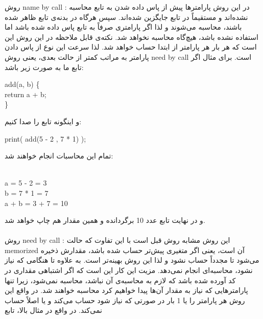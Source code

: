 

روش 
name by call
:
در این روش
پارامترها پیش از پاس داده شدن به تابع محاسبه نشده‌اند و مستقیماً
در تابع جایگزین شده‌اند.
 سپس هرگاه در بدنه‌ی تابع ظاهر شده باشند،
محاسبه می‌شوند و لذا اگر پارامتری صرفاً به تابع پاس داده شده باشد اما استفاده نشده باشد، هیچ‌گاه محاسبه نخواهد شد.
نکته‌ی قابل ملاحظه در این روش این است که
هر بار هر پارامتر از ابتدا حساب خواهد شد.
لذا سرعت این نوع از پاس دادن پارامتر به مراتب کمتر از حالت بعدی،
یعنی روش
need by call
است.
برای مثال اگر تابع ما به صورت زیر باشد:
\begin{latin}
add(a, b)
\small\{
\\
return a + b;
\\
\small\}
\end{latin}
و اینگونه تابع را صدا کنیم:
\\
\begin{latin}
print( add(5 - 2 , 7  * 1) );
\\
\end{latin}
تمام این محاسبات انجام خواهند شد:
\begin{latin}
\\
a = 5 - 2 = 3
\\
b = 7 * 1 = 7
\\
a + b = 3 + 7 = 10
\end{latin}
و در نهایت تابع عدد 10 
برگردانده  و
همین مقدار هم چاپ خواهد شد.
\\ \\
روش
need by call
:
این روش مشابه روش قبل 
است با این تفاوت که
حالت
memorized
آن است،
یعنی اگر متغیری پیش‌تر حساب شده باشد،
مقدارش ذخیره می‌شود تا مجدداً حساب نشود
 و لذا این روش بهینه‌تر است.
به علاوه تا هنگامی
که نیاز نشود،
محاسبه‌ای انجام نمی‌دهد.
مزیت این کار این است که اگر اشتباهی مقداری در کد آورده شده باشد که لازم به محاسبه‌ی
آن نباشد،
محاسبه نمی‌شود،
زیرا تنها پارامترهایی که نیاز به مقدار آن‌ها پیدا خواهیم کرد محاسبه خواهند شد.
در واقع این روش
هر پارامتر را یا 1 بار در صورتی که نیاز شود حساب می‌کند و یا اصلاً حساب نمی‌کند.
در واقع در مثال بالا، 
تابع 
\begin{latin}
\end{latin}

